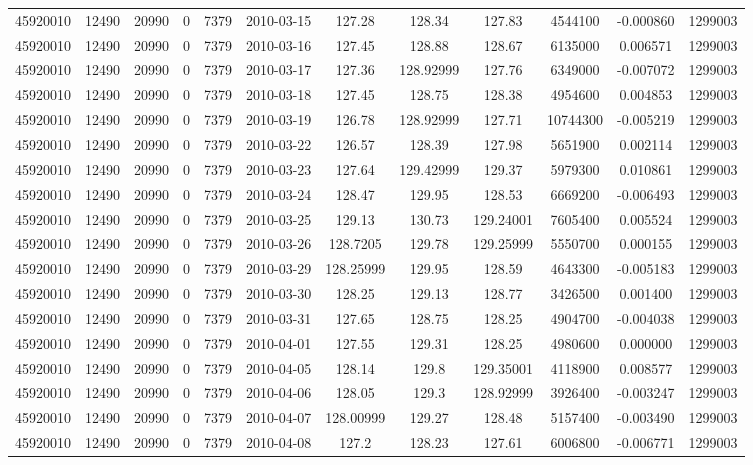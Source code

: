 \documentclass[12 pt]{article}
\begin{document}
\begin{flushleft}
\begin{table}[h]
\begin{tabular}{c c c c c c c c c c c c }
45920010 & 12490 & 20990 & 0 & 7379 & 2010-03-15 & 127.28 & 128.34 & 127.83 & 4544100 & -0.000860 & 1299003\\
45920010 & 12490 & 20990 & 0 & 7379 & 2010-03-16 & 127.45 & 128.88 & 128.67 & 6135000 & 0.006571 & 1299003\\
45920010 & 12490 & 20990 & 0 & 7379 & 2010-03-17 & 127.36 & 128.92999 & 127.76 & 6349000 & -0.007072 & 1299003\\
45920010 & 12490 & 20990 & 0 & 7379 & 2010-03-18 & 127.45 & 128.75 & 128.38 & 4954600 & 0.004853 & 1299003\\
45920010 & 12490 & 20990 & 0 & 7379 & 2010-03-19 & 126.78 & 128.92999 & 127.71 & 10744300 & -0.005219 & 1299003\\
45920010 & 12490 & 20990 & 0 & 7379 & 2010-03-22 & 126.57 & 128.39 & 127.98 & 5651900 & 0.002114 & 1299003\\
45920010 & 12490 & 20990 & 0 & 7379 & 2010-03-23 & 127.64 & 129.42999 & 129.37 & 5979300 & 0.010861 & 1299003\\
45920010 & 12490 & 20990 & 0 & 7379 & 2010-03-24 & 128.47 & 129.95 & 128.53 & 6669200 & -0.006493 & 1299003\\
45920010 & 12490 & 20990 & 0 & 7379 & 2010-03-25 & 129.13 & 130.73 & 129.24001 & 7605400 & 0.005524 & 1299003\\
45920010 & 12490 & 20990 & 0 & 7379 & 2010-03-26 & 128.7205 & 129.78 & 129.25999 & 5550700 & 0.000155 & 1299003\\
45920010 & 12490 & 20990 & 0 & 7379 & 2010-03-29 & 128.25999 & 129.95 & 128.59 & 4643300 & -0.005183 & 1299003\\
45920010 & 12490 & 20990 & 0 & 7379 & 2010-03-30 & 128.25 & 129.13 & 128.77 & 3426500 & 0.001400 & 1299003\\
45920010 & 12490 & 20990 & 0 & 7379 & 2010-03-31 & 127.65 & 128.75 & 128.25 & 4904700 & -0.004038 & 1299003\\
45920010 & 12490 & 20990 & 0 & 7379 & 2010-04-01 & 127.55 & 129.31 & 128.25 & 4980600 & 0.000000 & 1299003\\
45920010 & 12490 & 20990 & 0 & 7379 & 2010-04-05 & 128.14 & 129.8 & 129.35001 & 4118900 & 0.008577 & 1299003\\
45920010 & 12490 & 20990 & 0 & 7379 & 2010-04-06 & 128.05 & 129.3 & 128.92999 & 3926400 & -0.003247 & 1299003\\
45920010 & 12490 & 20990 & 0 & 7379 & 2010-04-07 & 128.00999 & 129.27 & 128.48 & 5157400 & -0.003490 & 1299003\\
45920010 & 12490 & 20990 & 0 & 7379 & 2010-04-08 & 127.2 & 128.23 & 127.61 & 6006800 & -0.006771 & 1299003\\

\end{tabular}
\end{table}
\end{flushleft}
\end{document}
